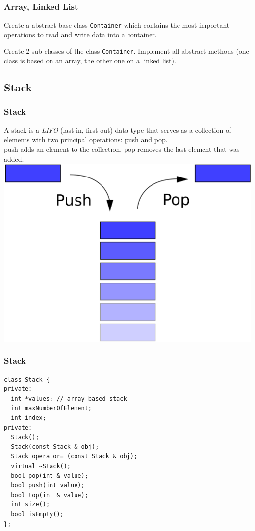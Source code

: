 \begin{frame}[fragile]
\frametitle{Array, Linked List}
\begin{exercise}
Create a abstract base class \verb|Container| which contains the most
important operations to read and write data into a container.
\end{exercise}
\begin{exercise}
Create 2 sub classes of the class \verb|Container|. Implement all abstract
methods (one class is based on an array, the other one on a linked list).
\end{exercise}
\end{frame}

\subsection{Stack}
\begin{frame}[fragile]
\frametitle{Stack}
A stack is a \emph{LIFO} (last in, first out) data type that serves as a collection
of elements with two principal operations: push and pop.\\
push adds an element to the collection, pop removes the last element that was added.\\
\vspace{1mm}
\includegraphics[scale=0.06]{img/stack.png}
\end{frame}

\begin{frame}[fragile]
\frametitle{Stack}
{\tiny
\begin{lstlisting}
class Stack {
private:
  int *values; // array based stack
  int maxNumberOfElement;
  int index;
private:
  Stack();
  Stack(const Stack & obj);
  Stack operator= (const Stack & obj);
  virtual ~Stack();
  bool pop(int & value);
  bool push(int value);
  bool top(int & value);
  int size();
  bool isEmpty();
};
\end{lstlisting}
}
\end{frame}

